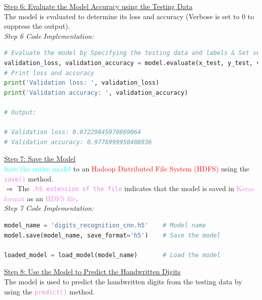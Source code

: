 \documentclass{book}
\begin{document}
\uline{Step 6: Evaluate the Model Accuracy using the Testing Data}\\
\vspace{1mm}
The model is evaluated to determine its loss and accuracy (Verbose is set to 0 to suppress the output).\\
\vspace{3mm}
\textit{\large{Step 6 Code Implementation:}}
\begin{lstlisting}[language=Python, basicstyle=\ttfamily\small, keywordstyle=\color{blue}, commentstyle=\color{forestgreen}, stringstyle=\color{red}, showstringspaces=false]
# Evaluate the model by Specifying the testing data and labels & Set verbose to 0
validation_loss, validation_accuracy = model.evaluate(x_test, y_test, verbose=0)
# Print loss and accuracy
print('Validation loss: ', validation_loss)
print('Validation accuracy: ', validation_accuracy)

# Output:

# Validation loss: 0.07229845970869064
# Validation accuracy: 0.9776999950408936
\end{lstlisting}
\uline{Step 7: Save the Model}\\
\vspace{1mm}
\textcolor{cyan}{Save the entire model} to an \textcolor{red}{Hadoop Distributed File System (HDFS)} using the \textcolor{violet}{\texttt{save()}} method.\\
$\Rightarrow$ The \textcolor{violet}{\texttt{.h5 extension of the file}} indicates that the model is saved in \textcolor{violet}{Keras format} as an \textcolor{violet}{HDFS file}.\\
\vspace{3mm}
\textit{\large{Step 7 Code Implementation:}}
\begin{lstlisting}[language=Python, basicstyle=\ttfamily\small, keywordstyle=\color{blue}, commentstyle=\color{forestgreen}, stringstyle=\color{red}, showstringspaces=false]
model_name = 'digits_recognition_cnn.h5'    # Model name
model.save(model_name, save_format='h5')    # Save the model

loaded_model = load_model(model_name)       # Load the model
\end{lstlisting}
\newpage
\uline{Step 8: Use the Model to Predict the Handwritten Digits}\\
\vspace{1mm}
The model is used to predict the handwritten digits from the testing data by using the \textcolor{violet}{\texttt{predict()}} method.\\
\end{document}

